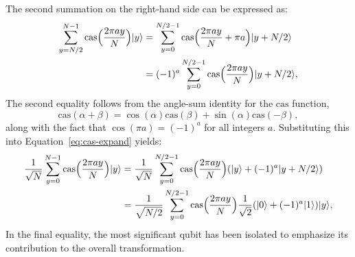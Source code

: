 \documentclass[11pt]{article}
\theoremstyle{definition}
\newcommand{\cas}{\mathrm{cas}}
\begin{document}
The second summation on the right-hand side can be expressed as:
\begin{align*}
	\sum_{y = N / 2}^{N - 1} \cas\Big( \frac{2\pi a y}{N} \Big) \ket{y}
    & = \sum_{y = 0}^{N / 2 - 1} \cas\Big( \frac{2\pi a y}{N} + \pi a \Big) \ket{y + N/2} \\
    & = (-1)^a \sum_{y = 0}^{N / 2 - 1} \cas\Big( \frac{2\pi a y}{N} \Big) \ket{y + N/2},
\end{align*}
The second equality follows from the angle-sum identity for the \( \cas \) function,
\[
\cas(\alpha + \beta) = \cos(\alpha)\cas(\beta) + \sin(\alpha)\cas(-\beta),
\]
along with the fact that \( \cos(\pi a) = (-1)^a \) for all integers \( a \). Substituting this into Equation~\eqref{eq:cas-expand} yields:
\begin{align}
	\frac{1}{\sqrt{N}} \sum_{y = 0}^{N - 1} \cas\Big( \frac{2\pi a y}{N} \Big) \ket{y}
    & = \frac{1}{\sqrt{N}} \sum_{y = 0}^{N / 2 - 1} \cas\Big( \frac{2\pi a y}{N} \Big) (\ket{y} + (-1)^a \ket{y + N/2}) \nonumber \\
    & = \frac{1}{\sqrt{N / 2}} \sum_{y = 0}^{N / 2 - 1} \cas\Big( \frac{2\pi a y}{N} \Big) \frac{1}{\sqrt{2}} (\ket{0} + (-1)^a \ket{1}) \ket{y}, \label{eq:qht-alt} 
\end{align}
In the final equality, the most significant qubit has been isolated to emphasize its contribution to the overall transformation.
\end{document}
